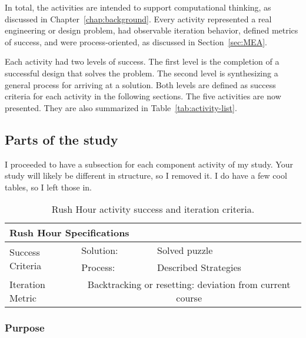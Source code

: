 In total, the activities are intended to support computational thinking, as discussed in Chapter~\ref{chap:background}. Every activity represented a real engineering or design problem, had observable iteration behavior, defined metrics of success, and were process-oriented, as discussed in Section~\ref{sec:MEA}.

 \label{sec:success-levels}
Each activity had two levels of success. The first level is the completion of a successful design that solves the problem. The second level is synthesizing a general process for arriving at a solution. Both levels are defined as success criteria for each activity in the following sections. The five activities are now presented. They are also summarized in Table~\ref{tab:activity-list}.

\subsection{Parts of the study}

	I proceeded to have a subsection for each component activity of my study. Your study will likely be different in structure, so I removed it. I do have a few cool tables, so I left those in.
	
		\begin{table}
	\begin{centering}
	\begin{tabular}{l  l   l}
		\multicolumn{3}{l}{{\large Rush Hour Specifications}} \\
		\toprule
		\multirow{2}{*}{Success Criteria}  
			& Solution: 		& Solved puzzle \\ \cmidrule(r){2-3}
			& Process:		& Described Strategies \\ \midrule
		Iteration Metric	 & \multicolumn{2}{c}{Backtracking or resetting: deviation from current course }\\ 
		\bottomrule
	\end{tabular}
	\caption{Rush Hour activity success and iteration criteria.}
	\label{tab:spec-rush-hour}
	\end{centering}
	\end{table}
	
	\subsubsection{Purpose}
	


